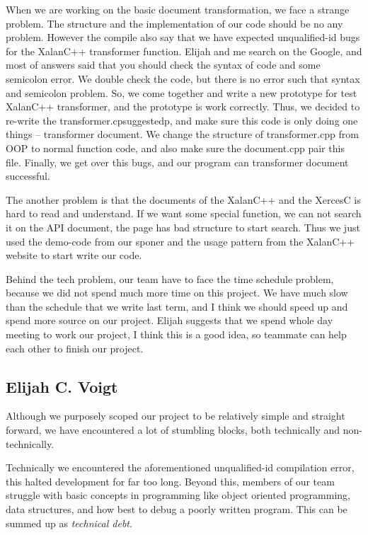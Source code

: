 When we are working on the basic document transformation, we face a strange problem.
The structure and the implementation of our code should be no any problem.
However the compile also say that we have expected unqualified-id bugs for the XalanC++ transformer function.
Elijah and me search on the Google, and most of answers said that you should check the syntax of code and some semicolon error.
We double check the code, but there is no error such that syntax and semicolon problem.
So, we come together and write a new prototype for test XalanC++ transformer, and the prototype is work correctly.
Thus, we decided to re-write the transformer.cpsuggestedp, and make sure this code is only doing one things -- transformer document.
We change the structure of transformer.cpp from OOP to normal function code, and also make sure the document.cpp pair this file.
Finally, we get over this bugs, and our program can transformer document successful. 

The another problem is that the documents of the XalanC++ and the XercesC is hard to read and understand.
If we want some special function, we can not search it on the API document, the page has bad structure to start search.
Thus we just used the demo-code from our sponer and the usage pattern from the XalanC++ website to start write our code.

Behind the tech problem, our team have to face the time schedule problem, because we did not spend much more time on this project.
We have much slow than the schedule that we write last term, and I think we should speed up and spend more source on our project.
Elijah suggests that we spend whole day meeting to work our project, I think this is a good idea, so teammate can help each other to finish our project.


\subsection{Elijah C. Voigt}

Although we purposely scoped our project to be relatively simple and straight forward, we have encountered a lot of stumbling blocks, both technically and non-technically.

Technically we encountered the aforementioned unqualified-id compilation error, this halted development for far too long.
Beyond this, members of our team struggle with basic concepts in programming like object oriented programming, data structures, and how best to debug a poorly written program.
This can be summed up as \textit{technical debt}.

